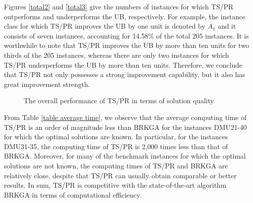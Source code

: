\documentclass[authoryear,12pt]{elsarticle}
\begin{document}
Figures \ref{total2} and \ref{total3} give the numbers of instances for which TS/PR outperforms and underperforms the UB, respectively. For example, the instance class for which TS/PR improves the UB by one unit is denoted by $A_{1}$ and it consists of seven instances, accounting for 14.58\% of the total 205 instances. It is worthwhile to note that TS/PR improves the UB by more than ten units for two thirds of the 205 instances, whereas there are only two instances for which TS/PR underperforms the UB by more than ten units. Therefore, we conclude that TS/PR not only possesses a strong improvement capability, but it also has great improvement strength.

\begin{figure*}[!h]
    \begin{center}
        \caption{The overall performance of TS/PR in terms of solution quality}\label{total solution quality}
    \end{center}
\end{figure*}


From Table \ref{table average time}, we observe that the average computing time of TS/PR is an order of magnitude less than BRKGA for the instances DMU21-40 for which the optimal solutions are known. In particular, for the instances DMU31-35, the computing time of TS/PR is 2,000 times less than that of BRKGA. Moreover, for many of the benchmark instances for which the optimal solutions are not known, the computing times of TS/PR and BRKGA are relatively close, despite that TS/PR can usually obtain comparable or better results. In sum, TS/PR is competitive with the state-of-the-art algorithm BRKGA in terms of computational efficiency.


\label{subsec Computational Results 1}
\end{document}

